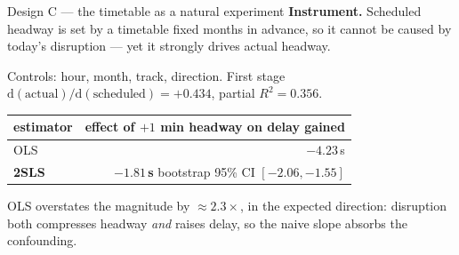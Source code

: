 \documentclass[aspectratio=169,10pt]{beamer}
\newcommand{\srcnote}[1]{{\scriptsize\color{ink3}#1}}
\newcommand{\hl}[1]{{\color{corange}\textbf{#1}}}
\begin{document}
\begin{frame}{Design C --- the timetable as a natural experiment}
  \textbf{Instrument.} Scheduled headway is set by a timetable fixed months in advance, so it
  cannot be caused by today's disruption --- yet it strongly drives actual headway.

  \vspace{0.5em}
  \centering

  \vspace{0.6em}
  \raggedright
  Controls: hour, month, track, direction. First stage
  $\mathrm{d}(\text{actual})/\mathrm{d}(\text{scheduled}) = +0.434$, partial $R^2 = 0.356$.

  \vspace{0.5em}
  \centering
  \begin{tabular}{@{}lr@{}}
    \toprule
    estimator & effect of $+1$ min headway on delay gained \\
    \midrule
    OLS & $-4.23$\,s \\
    \textbf{2SLS} & \hl{$-1.81$\,s} \quad bootstrap 95\% CI $[-2.06, -1.55]$ \\
    \bottomrule
  \end{tabular}

  \vspace{0.6em}
  \raggedright\small
  OLS overstates the magnitude by $\approx2.3\times$, in the expected direction: disruption
  both compresses headway \emph{and} raises delay, so the naive slope absorbs the
  confounding.
\end{frame}
\end{document}
